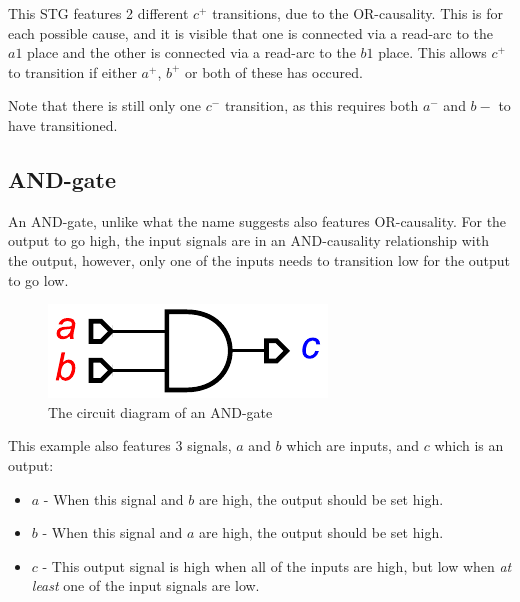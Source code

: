 \documentclass[british,conference,compsoc]{IEEEtran}
\begin{document}
This STG features 2 different $c^{+}$ transitions, due to the OR-causality. 
This is for each possible cause, and it is visible that one is connected via a 
read-arc to the $a1$ place and the other is connected via a read-arc to 
the $b1$ place. This allows $c^{+}$ to transition if either $a^{+}$, 
$b^{+}$ or both of these has occured.

Note that there is still only one $c^{-}$ transition, as this requires both
$a^{-}$ and $b{-}$ to have transitioned.


\subsection{AND-gate}

An AND-gate, unlike what the name suggests also features OR-causality. 
For the output to go high, the input signals are in an AND-causality relationship
with the output, however, only one of the inputs needs to transition low for the 
output to go low. 


\begin{figure}[h]
\begin{centering}
\includegraphics[scale=0.55]{Images/and-gate-circuit}
\par\end{centering}

\protect\caption{\label{fig:or-gate-circuit} The circuit diagram of an AND-gate}
\end{figure}

This example also features 3 signals, $a$ and $b$ which are inputs, and $c$
which is an output:

\begin{itemize}
  \item $a$ - When this signal and $b$ are high, the output should be set high.
  \item $b$ - When this signal and $a$ are high, the output should be set high.
  \item $c$ - This output signal is high when all of the inputs are high, but low when
		\emph{at least} one of the input signals are low.
\end{itemize}
\end{document}
